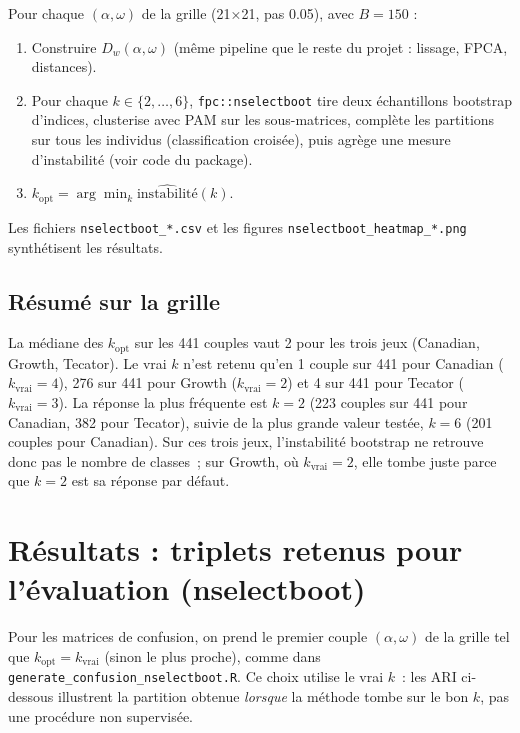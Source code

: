 \documentclass[11pt, a4paper]{article}
\begin{document}
Pour chaque $(\alpha,\omega)$ de la grille (21×21, pas 0.05), avec $B=150$ :

\begin{enumerate}
  \item Construire $D_w(\alpha,\omega)$ (même pipeline que le reste du projet :
    lissage, FPCA, distances).
  \item Pour chaque $k \in \{2,\ldots,6\}$, \texttt{fpc::nselectboot} tire deux
    échantillons bootstrap d'indices, clusterise avec PAM sur les sous-matrices,
    complète les partitions sur tous les individus (classification croisée), puis
    agrège une mesure d'instabilité (voir code du package).
  \item $k_\text{opt} = \arg\min_k \widehat{\text{instabilité}}(k)$.
\end{enumerate}

Les fichiers \texttt{nselectboot\_*.csv} et les figures
\texttt{nselectboot\_heatmap\_*.png} synthétisent les résultats.

\subsection{Résumé sur la grille}

La médiane des $k_\text{opt}$ sur les 441 couples vaut 2 pour les trois jeux
(Canadian, Growth, Tecator). Le vrai $k$ n'est retenu qu'en 1 couple sur 441
pour Canadian ($k_{\mathrm{vrai}}=4$), 276 sur 441 pour Growth
($k_{\mathrm{vrai}}=2$) et 4 sur 441 pour Tecator ($k_{\mathrm{vrai}}=3$).
La réponse la plus fréquente est $k=2$ (223 couples sur 441 pour Canadian,
382 pour Tecator), suivie de la plus grande valeur testée, $k=6$ (201 couples
pour Canadian). Sur ces trois jeux, l'instabilité bootstrap ne retrouve donc
pas le nombre de classes~; sur Growth, où $k_{\mathrm{vrai}}=2$, elle tombe
juste parce que $k=2$ est sa réponse par défaut.

\section{Résultats : triplets retenus pour l'évaluation (nselectboot)}

Pour les matrices de confusion, on prend le premier couple $(\alpha,\omega)$ de
la grille tel que $k_\text{opt} = k_{\mathrm{vrai}}$ (sinon le plus proche), comme
dans \texttt{generate\_confusion\_nselectboot.R}.
Ce choix utilise le vrai $k$~: les ARI ci-dessous illustrent la partition obtenue
\emph{lorsque} la méthode tombe sur le bon $k$, pas une procédure non supervisée.
\end{document}
